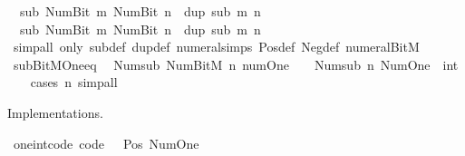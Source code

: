\begin{isabellebody}
\ \ {\isachardoublequoteopen}sub\ {\isacharparenleft}{\kern0pt}Num{\isachardot}{\kern0pt}Bit{}\ m{\isacharparenright}{\kern0pt}\ {\isacharparenleft}{\kern0pt}Num{\isachardot}{\kern0pt}Bit{}\ n{\isacharparenright}{\kern0pt}\ {\isacharequal}{\kern0pt}\ dup\ {\isacharparenleft}{\kern0pt}sub\ m\ n{\isacharparenright}{\kern0pt}\ {\isacharplus}{\kern0pt}\ {}{\isachardoublequoteclose}\isanewline
\ \ {\isachardoublequoteopen}sub\ {\isacharparenleft}{\kern0pt}Num{\isachardot}{\kern0pt}Bit{}\ m{\isacharparenright}{\kern0pt}\ {\isacharparenleft}{\kern0pt}Num{\isachardot}{\kern0pt}Bit{}\ n{\isacharparenright}{\kern0pt}\ {\isacharequal}{\kern0pt}\ dup\ {\isacharparenleft}{\kern0pt}sub\ m\ n{\isacharparenright}{\kern0pt}\ {\isacharminus}{\kern0pt}\ {}{\isachardoublequoteclose}\isanewline
%
\isadelimproof
\ \ %
\endisadelimproof
%
\isatagproof
{}\isamarkupfalse%
\ {\isacharparenleft}{\kern0pt}simp{\isacharunderscore}{\kern0pt}all\ only{\isacharcolon}{\kern0pt}\ sub{\isacharunderscore}{\kern0pt}def\ dup{\isacharunderscore}{\kern0pt}def\ numeral{\isachardot}{\kern0pt}simps\ Pos{\isacharunderscore}{\kern0pt}def\ Neg{\isacharunderscore}{\kern0pt}def\ numeral{\isacharunderscore}{\kern0pt}BitM{\isacharparenright}{\kern0pt}%
\endisatagproof
{\isafoldproof}%
%
\isadelimproof
\isanewline
%
\endisadelimproof
\isanewline
{}\isamarkupfalse%
\ sub{\isacharunderscore}{\kern0pt}BitM{\isacharunderscore}{\kern0pt}One{\isacharunderscore}{\kern0pt}eq{\isacharcolon}{\kern0pt}\isanewline
\ \ {\isacartoucheopen}{\isacharparenleft}{\kern0pt}Num{\isachardot}{\kern0pt}sub\ {\isacharparenleft}{\kern0pt}Num{\isachardot}{\kern0pt}BitM\ n{\isacharparenright}{\kern0pt}\ num{\isachardot}{\kern0pt}One{\isacharparenright}{\kern0pt}\ {\isacharequal}{\kern0pt}\ {}\ {\isacharasterisk}{\kern0pt}\ {\isacharparenleft}{\kern0pt}Num{\isachardot}{\kern0pt}sub\ n\ Num{\isachardot}{\kern0pt}One\ {\isacharcolon}{\kern0pt}{\isacharcolon}{\kern0pt}\ int{\isacharparenright}{\kern0pt}{\isacartoucheclose}\isanewline
%
\isadelimproof
\ \ %
\endisadelimproof
%
\isatagproof
{}\isamarkupfalse%
\ {\isacharparenleft}{\kern0pt}cases\ n{\isacharparenright}{\kern0pt}\ simp{\isacharunderscore}{\kern0pt}all%
\endisatagproof
{\isafoldproof}%
%
\isadelimproof
%
\endisadelimproof
%
\begin{isamarkuptext}%
Implementations.%
\end{isamarkuptext}\isamarkuptrue%
\isamarkupfalse%
\ one{\isacharunderscore}{\kern0pt}int{\isacharunderscore}{\kern0pt}code\ {\isacharbrackleft}{\kern0pt}code{\isacharbrackright}{\kern0pt}{\isacharcolon}{\kern0pt}\ {\isachardoublequoteopen}{}\ {\isacharequal}{\kern0pt}\ Pos\ Num{\isachardot}{\kern0pt}One{\isachardoublequoteclose}\isanewline

\end{isabellebody}
